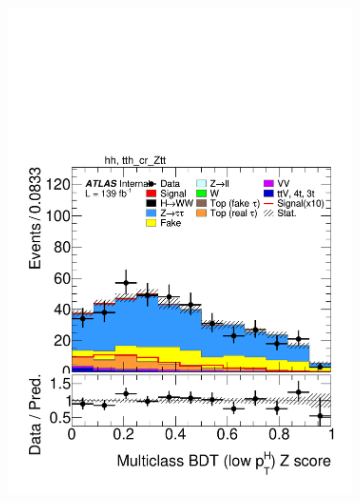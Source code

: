 \begin{figure}[h]
\begin{subfigure}[b]{0.32\textwidth}
    \includegraphics[width=\textwidth]{images/sr_cr_plots/plot_tth_Z_multiclass_lt200_hh_tth_cr_Ztt.pdf}
    \caption{}
  \end{subfigure}


\end{figure}
